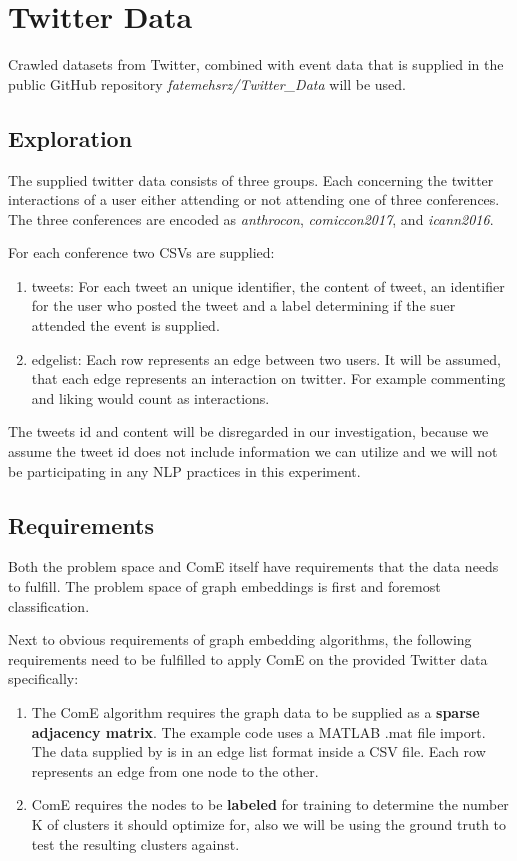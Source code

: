 \documentclass[sigconf]{acmart}
\begin{document}
\section{Twitter Data} \label{twitter_data}

Crawled datasets from Twitter, combined with event data that is supplied in the public GitHub repository \textit{fatemehsrz/Twitter\_Data} will be used.\cite{TwitterData}

\subsection{Exploration}

The supplied twitter data consists of three groups. Each concerning the twitter interactions of a user either attending or not attending one of three conferences. The three conferences are encoded as \textit{anthrocon}, \textit{comiccon2017}, and \textit{icann2016}.

For each conference two CSVs are supplied:

\begin{enumerate}
	\item tweets: For each tweet an unique identifier, the content of tweet, an identifier for the user who posted the tweet and a label determining if the suer attended the event is supplied. 
	\item edgelist: Each row represents an edge between two users. It will be assumed, that each edge represents an interaction on twitter. For example commenting and liking would count as interactions.
\end{enumerate}

The tweets id and content will be disregarded in our investigation, because we assume the tweet id does not include information we can utilize and we will not be participating in any NLP practices in this experiment.

\subsection{Requirements}

Both the problem space and ComE itself have requirements that the data needs to fulfill. The problem space of graph embeddings is first and foremost classification.

Next to obvious requirements of graph embedding algorithms, the following requirements need to be fulfilled to apply ComE on the provided Twitter data specifically:

\begin{enumerate}
	\item The ComE algorithm requires the graph data to be supplied as a \textbf{sparse adjacency matrix}. The example code uses a MATLAB .mat file import. The data supplied by \citeauthor{TwitterData} is in an edge list format inside a CSV file. Each row represents an edge from one node to the other.
	\item ComE requires the nodes to be \textbf{labeled} for training to determine the number K of clusters it should optimize for, also we will be using the ground truth to test the resulting clusters against.
\end{enumerate}
\end{document}
